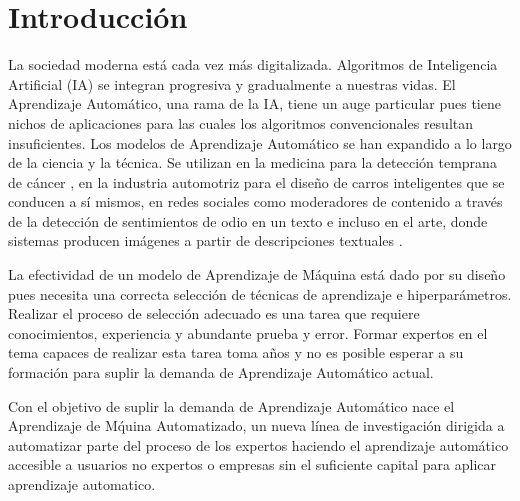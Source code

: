 \chapter*{Introducción}\label{chapter:introduction}
La sociedad moderna est\'a cada vez m\'as digitalizada. Algoritmos de Inteligencia Artificial (IA)  se integran progresiva y gradualmente a nuestras vidas. El Aprendizaje Autom\'atico, una rama de la IA, tiene un auge particular pues tiene nichos de aplicaciones para las cuales los algoritmos convencionales resultan insuficientes. Los modelos de Aprendizaje Autom\'atico se han expandido a lo largo  de la ciencia y la t\'ecnica.
Se utilizan en la medicina para la detecci\'on temprana de c\'ancer , 
en la industria automotriz para el dise\~no de carros inteligentes que se conducen a s\'i mismos,
en redes sociales como moderadores de contenido a trav\'es de la detecci\'on de sentimientos de odio en un texto  
e incluso en el arte, donde sistemas producen im\'agenes a partir de descripciones textuales . %

La efectividad de un modelo de Aprendizaje de M\'aquina est\'a dado por su dise\~no pues necesita una correcta selecci\'on de t\'ecnicas de aprendizaje e hiperpar\'ametros. Realizar el proceso de selecci\'on adecuado es una tarea que requiere conocimientos, experiencia y abundante prueba y error. Formar expertos en el tema capaces de realizar esta tarea toma a\~nos y no es posible esperar a su formaci\'on para suplir la demanda de Aprendizaje Autom\'atico actual.


Con el objetivo de suplir la demanda de Aprendizaje Autom\'atico nace el Aprendizaje de M\'quina Automatizado, un nueva l\'inea de investigaci\'on dirigida a automatizar parte del proceso de los expertos haciendo el aprendizaje autom\'atico accesible a usuarios no expertos o empresas sin el suficiente capital para aplicar aprendizaje automatico.


